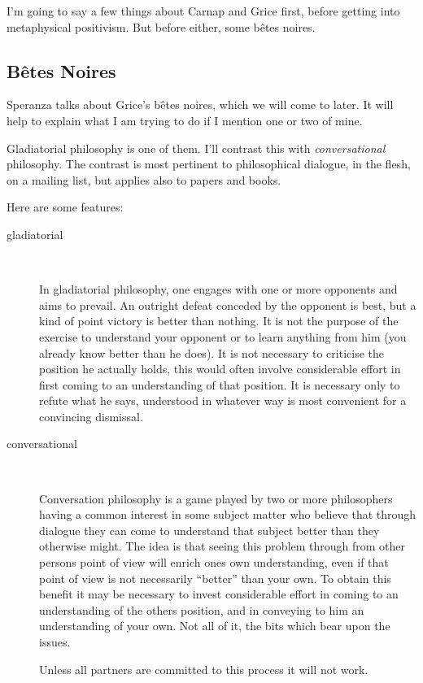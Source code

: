 \documentclass{rbjk}
\begin{document}
\begin{article}
I'm going to say a few things about Carnap and Grice first, before getting into metaphysical positivism. 
But before either, some b\^{e}tes noires.

\subsection{B\^{e}tes Noires}

Speranza talks about Grice's b\^{e}tes noires, which we will come to later.
It will help to explain what I am trying to do if I mention one or two of mine.

Gladiatorial philosophy is one of them.
I'll contrast this with {\it conversational} philosophy.
The contrast is most pertinent to philosophical dialogue, in the flesh, on a mailing list, but applies also to papers and books.

Here are some features:

\begin{description}

\item[gladiatorial] \ 

In gladiatorial philosophy, one engages with one or more opponents and aims to prevail.
An outright defeat conceded by the opponent is best, but a kind of point victory is better than nothing.
It is not the purpose of the exercise to understand your opponent or to learn anything from him (you already know better than he does).
It is not necessary to criticise the position he actually holds, this would often involve considerable effort in first coming to an understanding of that position.
It is necessary only to refute what he says, understood in whatever way is most convenient for a convincing dismissal.

\item[conversational] \ 

Conversation philosophy is a game played by two or more philosophers having a common interest in some subject matter who believe that through dialogue they can come to understand that subject better than they otherwise might.
The idea is that seeing this problem through from other persons point of view will enrich ones own understanding, even if that point of view is not necessarily ``better'' than your own.
To obtain this benefit it may be necessary to invest considerable effort in coming to an understanding of the others position, and in conveying to him an understanding of your own.
Not all of it, the bits which bear upon the issues.

Unless all partners are committed to this process it will not work.
\end{description}


\end{article}
\end{document}
